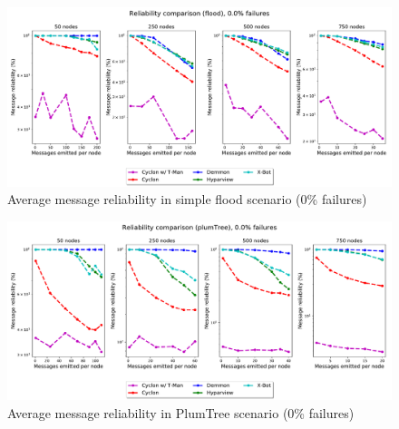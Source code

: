 \begin{figure}[htbp]
    \centering
    \includegraphics[width=\linewidth]{Chapters/evaluation/figures/flood/flood_0.0_failures_reliability.pdf}
    \caption{Average message reliability in simple flood scenario (0\% failures)}
    \label{fig:overlay_proto_res_msg_diss:0_failures_reliability_flood}
\end{figure}

\begin{figure}[htbp]
    \centering
    \includegraphics[width=\linewidth]{Chapters/evaluation/figures/flood/plumTree_0.0_failures_reliability.pdf}
    \caption{Average message reliability in PlumTree scenario (0\% failures)}
    \label{fig:overlay_proto_res_msg_diss:0_failures_reliability_plumTree}
\end{figure}

